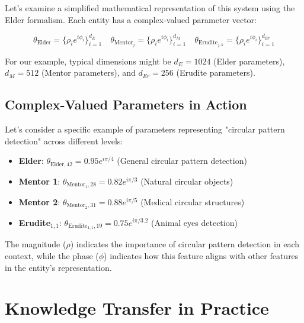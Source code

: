 Let's examine a simplified mathematical representation of this system using the Elder formalism. Each entity has a complex-valued parameter vector:

\begin{equation}
\theta_{\text{Elder}} = \{\rho_i e^{i\phi_i}\}_{i=1}^{d_E} \quad \theta_{\text{Mentor}_j} = \{\rho_i e^{i\phi_i}\}_{i=1}^{d_M} \quad \theta_{\text{Erudite}_{j,k}} = \{\rho_i e^{i\phi_i}\}_{i=1}^{d_{Er}}
\end{equation}

For our example, typical dimensions might be $d_E = 1024$ (Elder parameters), $d_M = 512$ (Mentor parameters), and $d_{Er} = 256$ (Erudite parameters).

\subsection{Complex-Valued Parameters in Action}

Let's consider a specific example of parameters representing "circular pattern detection" across different levels:

\begin{tcolorbox}[colback=TheoremBlue, colframe=DarkSkyBlue, title=Circular Pattern Parameters Across Entities, fonttitle=\bfseries\large]
\begin{itemize}
    \item \textbf{Elder}: $\theta_{\text{Elder},42} = 0.95e^{i\pi/4}$ (General circular pattern detection)
    \item \textbf{Mentor 1}: $\theta_{\text{Mentor}_1,28} = 0.82e^{i\pi/3}$ (Natural circular objects)
    \item \textbf{Mentor 2}: $\theta_{\text{Mentor}_2,31} = 0.88e^{i\pi/5}$ (Medical circular structures)
    \item \textbf{Erudite}$_{1,1}$: $\theta_{\text{Erudite}_{1,1},19} = 0.75e^{i\pi/3.2}$ (Animal eyes detection)
\end{itemize}
\end{tcolorbox}

The magnitude ($\rho$) indicates the importance of circular pattern detection in each context, while the phase ($\phi$) indicates how this feature aligns with other features in the entity's representation.

\section{Knowledge Transfer in Practice}

